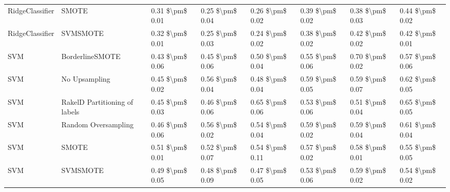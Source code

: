 \begin{tabular}{llllllll}
                RidgeClassifier &                         SMOTE &     0.31 \$\textbackslash pm\$ 0.01 &           0.25 \$\textbackslash pm\$ 0.04 &       0.26 \$\textbackslash pm\$ 0.02 &        0.39 \$\textbackslash pm\$ 0.02 &                         0.38 \$\textbackslash pm\$ 0.03 & 0.44 \$\textbackslash pm\$ 0.02 \\
                RidgeClassifier &                      SVMSMOTE &     0.32 \$\textbackslash pm\$ 0.01 &           0.25 \$\textbackslash pm\$ 0.03 &       0.24 \$\textbackslash pm\$ 0.02 &        0.38 \$\textbackslash pm\$ 0.02 &                         0.42 \$\textbackslash pm\$ 0.02 & 0.42 \$\textbackslash pm\$ 0.01 \\
                            SVM &               BorderlineSMOTE &     0.43 \$\textbackslash pm\$ 0.06 &           0.45 \$\textbackslash pm\$ 0.06 &       0.50 \$\textbackslash pm\$ 0.04 &        0.55 \$\textbackslash pm\$ 0.06 &                         0.70 \$\textbackslash pm\$ 0.02 & 0.57 \$\textbackslash pm\$ 0.06 \\
                            SVM &                 No Upsampling &     0.45 \$\textbackslash pm\$ 0.02 &           0.56 \$\textbackslash pm\$ 0.04 &       0.48 \$\textbackslash pm\$ 0.04 &        0.59 \$\textbackslash pm\$ 0.05 &                         0.59 \$\textbackslash pm\$ 0.07 & 0.62 \$\textbackslash pm\$ 0.05 \\
                            SVM & RakelD Partitioning of labels &     0.45 \$\textbackslash pm\$ 0.03 &           0.46 \$\textbackslash pm\$ 0.06 &       0.65 \$\textbackslash pm\$ 0.06 &        0.53 \$\textbackslash pm\$ 0.06 &                         0.51 \$\textbackslash pm\$ 0.04 & 0.65 \$\textbackslash pm\$ 0.05 \\
                            SVM &           Random Oversampling &     0.46 \$\textbackslash pm\$ 0.06 &           0.56 \$\textbackslash pm\$ 0.02 &       0.54 \$\textbackslash pm\$ 0.04 &        0.59 \$\textbackslash pm\$ 0.02 &                         0.59 \$\textbackslash pm\$ 0.04 & 0.61 \$\textbackslash pm\$ 0.04 \\
                            SVM &                         SMOTE &     0.51 \$\textbackslash pm\$ 0.01 &           0.52 \$\textbackslash pm\$ 0.07 &       0.54 \$\textbackslash pm\$ 0.11 &        0.57 \$\textbackslash pm\$ 0.02 &                         0.58 \$\textbackslash pm\$ 0.01 & 0.55 \$\textbackslash pm\$ 0.05 \\
                            SVM &                      SVMSMOTE &     0.49 \$\textbackslash pm\$ 0.05 &           0.48 \$\textbackslash pm\$ 0.09 &       0.47 \$\textbackslash pm\$ 0.05 &        0.53 \$\textbackslash pm\$ 0.06 &                         0.59 \$\textbackslash pm\$ 0.02 & 0.54 \$\textbackslash pm\$ 0.02 \\

\end{tabular}
